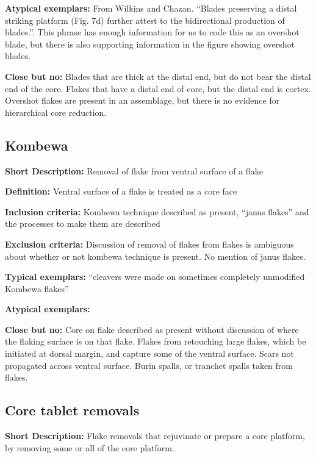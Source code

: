 \documentclass[
]{article}
\begin{document}
\textbf{Atypical exemplars:} From Wilkins and Chazan. ``Blades
preserving a distal striking platform (Fig. 7d) further attest to the
bidirectional production of blades.''. This phrase has enough
information for us to code this as an overshot blade, but there is also
supporting information in the figure showing overshot blades.

\textbf{Close but no:} Blades that are thick at the distal end, but do
not bear the distal end of the core. Flakes that have a distal end of
core, but the distal end is cortex. Overshot flakes are present in an
assemblage, but there is no evidence for hierarchical core reduction.

\hypertarget{kombewa}{%
\subsection{Kombewa}\label{kombewa}}

\textbf{Short Description:} Removal of flake from ventral surface of a
flake

\textbf{Definition:} Ventral surface of a flake is treated as a core
face

\textbf{Inclusion criteria:} Kombewa technique described as present,
``janus flakes'' and the processes to make them are described

\textbf{Exclusion criteria:} Discussion of removal of flakes from flakes
is ambiguous about whether or not kombewa technique is present. No
mention of janus flakes.

\textbf{Typical exemplars:} ``cleavers were made on sometimes completely
unmodified Kombewa flakes''

\textbf{Atypical exemplars:}

\textbf{Close but no:} Core on flake described as present without
discussion of where the flaking surface is on that flake. Flakes from
retouching large flakes, which be initiated at dorsal margin, and
capture some of the ventral surface. Scars not propagated across ventral
surface. Burin spalls, or tranchet spalls taken from flakes.

\hypertarget{core-tablet-removals}{%
\subsection{Core tablet removals}\label{core-tablet-removals}}

\textbf{Short Description:} Flake removals that rejuvinate or prepare a
core platform, by removing some or all of the core platform.
\end{document}
